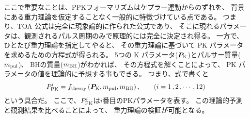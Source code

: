 ここで重要なことは、PPKフォーマリズムはケプラー運動からのずれを、
背景にある重力理論を仮定することなく一般的に特徴づけている点である。
つまり、TOA 公式は完全に現象論的に作られた公式であり、
そこに現れるパラメータは、観測されるパルス周期のみで原理的には完全に決定され得る。
一方で、ひとたび重力理論を指定してやると、
その重力理論に基づいて PK パラメータを求めるための方程式が得られる。
5つの K パラメータ(${\bm P}_{\rm K}$)とパルサー質量($m_{\rm pul}$)、
BHの質量($m_{\rm BH}$)がわかれば、
その方程式を解くことによって、
PK パラメータの値を理論的に予想する事もできる。
つまり、式で書くと
\begin{equation}
P_{\rm PK}^i=f_{\rm theory} \, ({\bm P}_{\rm K}, m_{\rm pul}, m_{\rm BH}) \,, \qquad
 (i = 1\,, 2\,,  \cdots\,, 12)
\label{eq1}
\end{equation}
という具合だ。
ここで、$P_{\rm PK}^i$は$i$番目のPKパラメータを表す。
この理論的予測と観測結果を比べることによって、
重力理論の検証が可能となる。

